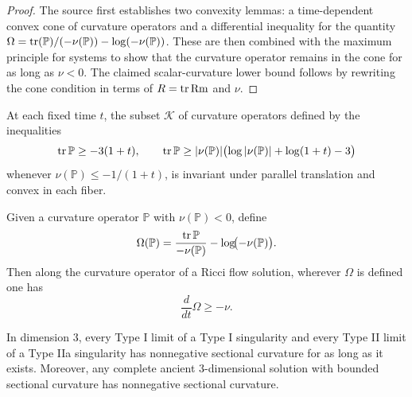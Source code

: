 \begin{proof}
The source first establishes two convexity lemmas: a time-dependent convex cone of curvature operators and a differential inequality for the quantity \(\Omega=\operatorname{tr}(\mathbb P)/(-\nu(\mathbb P))-\log(-\nu(\mathbb P))\). These are then combined with the maximum principle for systems to show that the curvature operator remains in the cone for as long as \(\nu<0\). The claimed scalar-curvature lower bound follows by rewriting the cone condition in terms of \(R=\operatorname{tr} \operatorname{Rm}\) and \(\nu\).
\end{proof}

\begin{lemma}
\label{ch09-lem-pinching-cone-convexity}
At each fixed time \(t\), the subset \(\mathcal K\) of curvature operators defined by the inequalities
\[
\operatorname{tr}\mathbb P\ge -3(1+t),\qquad
\operatorname{tr}\mathbb P\ge |\nu(\mathbb P)|\bigl(\log|\nu(\mathbb P)|+\log(1+t)-3\bigr)
\]
whenever \(\nu(\mathbb P)\le -1/(1+t)\), is invariant under parallel translation and convex in each fiber.
\end{lemma}

\begin{lemma}
\label{ch09-lem-omega-derivative}
Given a curvature operator \(\mathbb P\) with \(\nu(\mathbb P)<0\), define
\[
\Omega(\mathbb P)=\frac{\operatorname{tr}\mathbb P}{-\nu(\mathbb P)}-\log\!\bigl(-\nu(\mathbb P)\bigr).
\]
Then along the curvature operator of a Ricci flow solution, wherever \(\Omega\) is defined one has
\[
\frac{d}{dt}\Omega\ge -\nu.
\]
\end{lemma}

\begin{corollary}
\label{ch09-cor-nonnegative-curvature-limits}
In dimension \(3\), every Type I limit of a Type I singularity and every Type II limit of a Type IIa singularity has nonnegative sectional curvature for as long as it exists. Moreover, any complete ancient \(3\)-dimensional solution with bounded sectional curvature has nonnegative sectional curvature.
\end{corollary}

